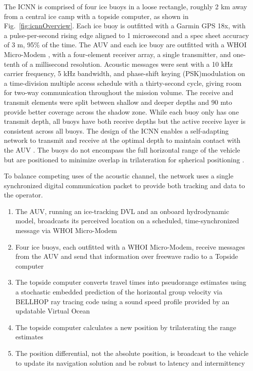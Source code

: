 The ICNN is comprised of four ice buoys in a loose rectangle, roughly 2 km away from a central ice camp with a topside computer, as shown in Fig.~\ref{fig:icnnOverview}.
Each ice buoy is outfitted with a Garmin GPS 18x, with a pulse-per-second rising edge aligned to 1 microsecond and a spec sheet accuracy of 3 m, 95\% of the time.
The AUV and each ice buoy are outfitted with a WHOI Micro-Modem \citep{Singh2006}, with a four-element receiver array, a single transmitter, and one-tenth of a millisecond resolution.
Acoustic messages were sent with a 10 kHz carrier frequency, 5 kHz bandwidth, and phase-shift keying (PSK)modulation on a time-division multiple access schedule with a thirty-second cycle, giving room for two-way communication throughout the mission volume.
The receive and transmit elements were split between shallow and deeper depths and 90 m\textemdash to provide better coverage across the shadow zone.
While each buoy only has one transmit depth, all buoys have both receive depths but the active receive layer is consistent across all buoys. 
The design of the ICNN enables a self-adapting network to transmit and receive at the optimal depth to maintain contact with the AUV \citep{schneider_self-adapting_2020}.
The buoys do not encompass the full horizontal range of the vehicle but are positioned to minimize overlap in trilateration for spherical positioning \citep{deffenbaugh1996posit}.

To balance competing uses of the acoustic channel, the network uses a single synchronized digital communication packet to provide both tracking and data to the operator.
\begin{enumerate}
\item The AUV, running an ice-tracking DVL and an onboard hydrodynamic model, broadcasts its perceived location on a scheduled, time-synchronized message via WHOI Micro-Modem
\item Four ice buoys, each outfitted with a WHOI Micro-Modem, receive messages from the AUV and send that information over freewave radio to a Topside computer
\item The topside computer converts travel times into pseudorange estimates using a stochastic embedded prediction of the horizontal group velocity via BELLHOP ray tracing code \citep{Porter2011} using a sound speed profile provided by an updatable Virtual Ocean \citep{schneider_netsim_2018,bhatt_embedded_2022}
\item The topside computer calculates a new position by trilaterating the range estimates
\item The position differential, not the absolute position, is broadcast to the vehicle to update its navigation solution and be robust to latency and intermittency
\end{enumerate}


